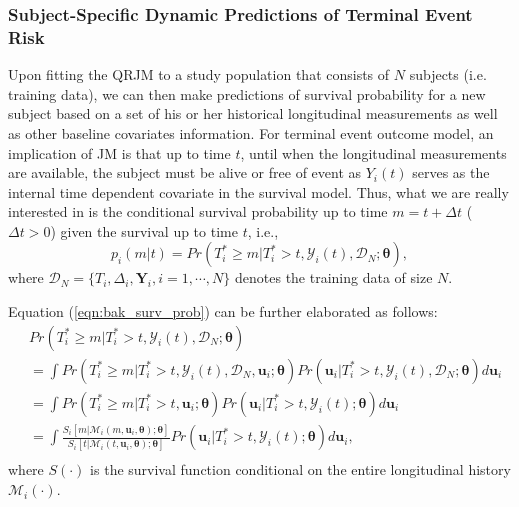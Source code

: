 \subsubsection{Subject-Specific Dynamic Predictions of Terminal Event Risk}\label{sec:bak_pred_jm}
Upon fitting the QRJM to a study population that consists of $N$ subjects (i.e. training data), we can then make predictions of survival probability for a new subject based on a set of his or her historical longitudinal measurements as well as other baseline covariates information. For terminal event outcome model, an implication of JM is that up to time $t$, until when the longitudinal measurements are available, the subject must be alive or free of event as $Y_{i}(t)$ serves as the internal time dependent covariate in the survival model. Thus, what we are really interested in is the conditional survival probability up to time $m = t+\Delta t$ ($\Delta t > 0$) given the survival up to time $t$, i.e.,
\begin{equation}\label{eqn:bak_surv_prob}
p_i(m|t) = Pr(T_i^*\ge m|T_i^*>t, \mathcal{Y}_{i}(t), \mathcal{D}_N;\boldsymbol{\theta}),
\end{equation}
\noindent where $\mathcal{D}_N=\{T_i, \Delta_i, \boldsymbol{Y}_i, i=1, \cdots, N\}$ denotes the training data of size $N$.

Equation (\ref{eqn:bak_surv_prob}) can be further elaborated as follows:
\begin{equation}\label{eqn:bak_surv_prob_derv}
     \begin{aligned}
      & Pr(T_i^*\ge m|T_i^*>t, \mathcal{Y}_{i}(t), \mathcal{D}_N;\boldsymbol{\theta})\\
      &=\int Pr(T_i^*\ge m|T_i^*>t, \mathcal{Y}_{i}(t), \mathcal{D}_N, {\boldsymbol u}_i;\boldsymbol{\theta})
 {Pr({\boldsymbol u}_i|T_i^*>t, \mathcal{Y}_{i}(t), \mathcal{D}_N;\boldsymbol{\theta})d{\boldsymbol u}_i}  \\
      &= {\int Pr(T_i^*\ge m|T_i^*>t, {\boldsymbol u}_i;\boldsymbol{\theta})Pr({\boldsymbol u}_i|T_i^*>t, \mathcal{Y}_{i}(t);\boldsymbol{\theta})d{\boldsymbol u}_i} \\
       &= {\int\frac{{S}_i[m|\mathcal{M}_{i}(m,{\boldsymbol u}_i, \boldsymbol{\theta});\boldsymbol{\theta}]}{{S}_i[t|\mathcal{M}_{i}(t,{\boldsymbol u}_i, \boldsymbol{\theta});\boldsymbol{\theta}]}Pr({\boldsymbol u}_i|T_i^*>t, \mathcal{Y}_{i}(t);\boldsymbol{\theta})d{\boldsymbol u}_i}, \\
     \end{aligned}
     \phantom{\hspace{0cm}}
\end{equation}
\noindent where ${S}(\cdot)$ is the survival function conditional on the entire longitudinal history $\mathcal{M}_{i}(\cdot)$.


